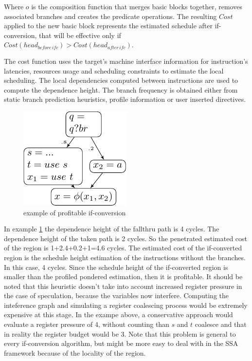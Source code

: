 Where $o$ is the composition function that merges basic blocks together, removes associated branches and creates the predicate operations. The resulting $Cost$ applied to the new basic block represents the estimated schedule after if-conversion, that will be effective only if $Cost(head_{before\,ifc}) > Cost(head_{after\,ifc})$. 
 
The cost function uses the target's machine interface information for instruction's latencies, resources usage and scheduling constraints to estimate the local scheduling. The local dependencies computed between instructions are used to compute the dependence height. The branch frequency is obtained either from static branch prediction heuristics, profile information or user inserted directives.
\begin{figure}
    \includegraphics[scale=0.8]{ssa_freq}
\caption{example of profitable if-conversion}
\label{fig:ssa_freq}
\end{figure}

In example \ref{fig:ssa_freq} the dependence height of the fallthru path is 4 cycles. The dependence height of the taken path is 2 cycles. So the penetrated estimated cost of the region is 1+2.4+0.2+1=4.6 cycles. The estimated cost of the if-converted region is the schedule height estimation of the instructions without the branches. In this case, 4 cycles. Since the schedule height of the if-converted region is smaller than the profiled pondered estimation, then it is profitable.
It should be noted that this heuristic doesn't take into account increased register pressure in the case of speculation, because the variables now interfere. Computing the inteference graph and simulating a register coalescing process would be extremely expensive at this stage. In the exampe above, a conservative approach would evaluate a register pressure of 4, without counting than $s$ and $t$ coalesce and that in reality the register budget would be 3. Note that this problem is general to every if-conversion algorithm, but might be more easy to deal with in the SSA framework because of the locality of the region.

